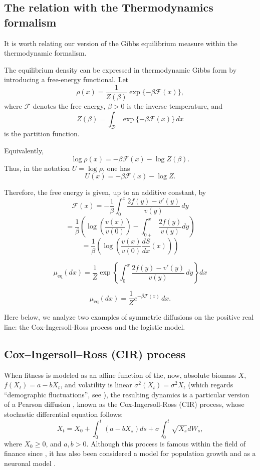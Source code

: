 \documentclass[12pt]{article}
\begin{document}
\subsection{The relation with the Thermodynamics formalism}

It is worth relating our version of the Gibbs equilibrium measure within the thermodynamic formalism.

The equilibrium density can be expressed in thermodynamic Gibbs form by introducing
a free-energy functional. Let
\[
\rho(x)=\frac{1}{Z(\beta)}\exp\{-\beta \mathcal F(x)\},
\]
where \(\mathcal F\) denotes the free energy, \(\beta>0\) is the inverse
temperature, and
\[
Z(\beta)=\int_{\mathcal D}\exp\{-\beta \mathcal F(x)\}\,dx
\]
is the partition function.

Equivalently,
\[
\log \rho(x)=-\beta \mathcal F(x)-\log Z(\beta).
\]
Thus, in the notation \(U=\log\rho\), one has
\[
U(x)= -\beta \mathcal F(x)-\log Z.
\]



Therefore, the free energy is given, up to an additive constant, by
\[
\mathcal F(x)
=
-\frac{1}{\beta}
\int_0^x
\frac{2f(y)-v'(y)}{v(y)}\,dy\]
\[=\frac{1}{\beta}\left(\log \left(\frac{v(x)}{v(0)}\right)-\int_{0+}^x\frac{2f(y)}{v(y)}dy\right)
\]
\[=\frac{1}{\beta}\left(\log \left(\frac{v(x)}{v(0)}\frac{dS}{dx}(x)\right)\right)\]
\vskip 10pt

\[
\mu_{\mathrm{eq}}(dx)
=
\frac{1}{Z}
\exp\!\left\{
\int_0^x
\frac{2f(y)-v'(y)}{v(y)}\,dy
\right\}
dx
\]

\[
\mu_{\mathrm{eq}}(dx)
=
\frac{1}{Z}
e^{-\beta \mathcal F(x)}\,dx.
\]

Here below, we analyze two examples of symmetric diffusions on the positive real line: the Cox-Ingersoll-Ross process and the logistic model. 








\subsection{Cox–Ingersoll–Ross (CIR) process}\label{sec:CIR}

When fitness is modeled as an affine function of the, now, absolute biomass $X$, $f(X_t)=a-bX_t$, and volatility is linear $\sigma^2(X_t)=\sigma^2 X_t$ (which regards  ``demographic fluctuations'', see \citep{azaele2006dynamical}), the resulting dynamics is a particular version of a Pearson diffusion \citep{forman2008pearson}, known as the Cox-Ingersoll-Ross (CIR) process, whose stochastic differential equation follows:
\begin{equation}\label{eq:CIR}
 X_t=X_0+\int_0^t(a-bX_s)ds+\sigma\int_0^t\sqrt{X_s}dW_s, 
\end{equation}
where $X_0\geq0$, and $a,b>0$.
Although this process is famous within the field of finance since \citep{cox1985theory}, it has also been considered a model for population growth \citep{feller1951diffusion} and as a neuronal model \citep{sacerdote2012stochastic}.
\end{document}
